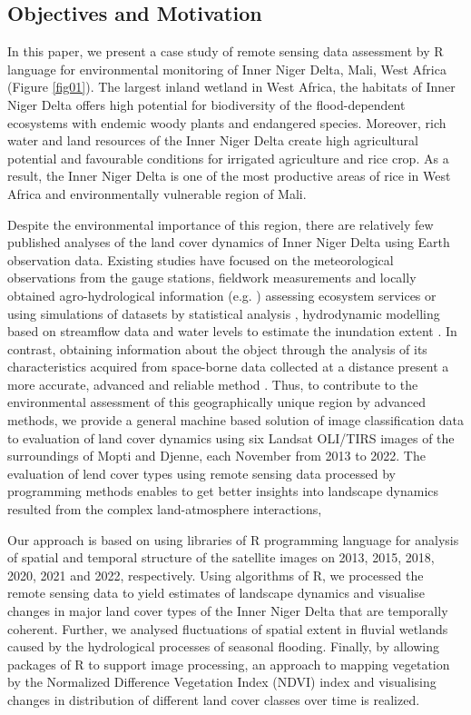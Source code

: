 \documentclass[remotesensing,article,submit,pdftex,moreauthors]{Definitions/mdpi}
\begin{document}
\subsection{Objectives and Motivation}
In this paper, we present a case study of remote sensing data assessment by R language for environmental monitoring of Inner Niger Delta, Mali, West Africa (Figure \ref{fig01}). The largest inland wetland in West Africa, the habitats of Inner Niger Delta offers high potential for biodiversity of the flood-dependent ecosystems with endemic woody plants and endangered species. Moreover, rich water and land resources of the Inner Niger Delta create high agricultural potential and favourable conditions for irrigated agriculture and rice crop. As a result, the Inner Niger Delta is one of the most productive areas of rice in West Africa and environmentally vulnerable region of Mali.

Despite the environmental importance of this region, there are relatively few published analyses of the land cover dynamics of Inner Niger Delta using Earth observation data. Existing studies have focused on the meteorological observations from the gauge stations, fieldwork measurements and locally obtained agro-hydrological information (e.g. \cite{dadson2010wetland}) assessing ecosystem services \cite{REBELO201358} or using simulations of datasets by statistical analysis \cite{Mascaro}, hydrodynamic modelling based on streamflow data and water levels to estimate the inundation extent \cite{HAQUE2020100703,HAQUE2021104187}. In contrast, obtaining information about the object through the analysis of its characteristics acquired from space-borne data collected at a distance present a more accurate, advanced and reliable method \cite{Maini,rs70202127}. Thus, to contribute to the environmental assessment of this geographically unique region by advanced methods, we provide a general machine based solution of image classification data to evaluation of land cover dynamics using six Landsat OLI/TIRS images of the surroundings of Mopti and Djenne, each November from 2013 to 2022. The evaluation of lend cover types using remote sensing data processed by programming methods enables to get better insights into landscape dynamics resulted from the complex land-atmosphere interactions, 

Our approach is based on using libraries of R programming language for analysis of spatial and temporal structure of the satellite images on 2013, 2015, 2018, 2020, 2021 and 2022, respectively. Using algorithms of R, we processed the remote sensing data to yield estimates of landscape dynamics and visualise changes in major land cover types of the Inner Niger Delta that are temporally coherent. Further, we analysed fluctuations of spatial extent in fluvial wetlands caused by the hydrological processes of seasonal flooding. Finally, by allowing packages of R to support image processing, an approach to mapping vegetation by the Normalized Difference Vegetation Index (NDVI) index and visualising changes in distribution of different land cover classes over time is realized. 
\end{document}
